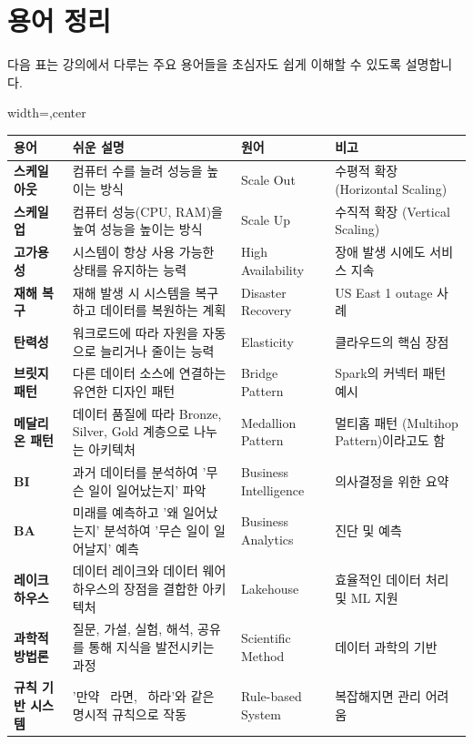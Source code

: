 \documentclass[11pt,a4paper]{article}
\theoremstyle{definition}
\begin{document}
\newpage
\section*{용어 정리}

\begin{tcolorbox}[summarybox={핵심 용어 및 설명}]
다음 표는 강의에서 다루는 주요 용어들을 초심자도 쉽게 이해할 수 있도록 설명합니다.

\begin{adjustbox}{width=\textwidth,center}
\begin{tabular}{llll}
\toprule
\textbf{용어} & \textbf{쉬운 설명} & \textbf{원어} & \textbf{비고} \\
\midrule
\textbf{스케일 아웃} & 컴퓨터 수를 늘려 성능을 높이는 방식 & Scale Out & 수평적 확장 (Horizontal Scaling) \\
\textbf{스케일 업} & 컴퓨터 성능(CPU, RAM)을 높여 성능을 높이는 방식 & Scale Up & 수직적 확장 (Vertical Scaling) \\
\textbf{고가용성} & 시스템이 항상 사용 가능한 상태를 유지하는 능력 & High Availability & 장애 발생 시에도 서비스 지속 \\
\textbf{재해 복구} & 재해 발생 시 시스템을 복구하고 데이터를 복원하는 계획 & Disaster Recovery & US East 1 outage 사례 \\
\textbf{탄력성} & 워크로드에 따라 자원을 자동으로 늘리거나 줄이는 능력 & Elasticity & 클라우드의 핵심 장점 \\
\textbf{브릿지 패턴} & 다른 데이터 소스에 연결하는 유연한 디자인 패턴 & Bridge Pattern & Spark의 커넥터 패턴 예시 \\
\textbf{메달리온 패턴} & 데이터 품질에 따라 Bronze, Silver, Gold 계층으로 나누는 아키텍처 & Medallion Pattern & 멀티홉 패턴 (Multihop Pattern)이라고도 함 \\
\textbf{BI} & 과거 데이터를 분석하여 '무슨 일이 일어났는지' 파악 & Business Intelligence & 의사결정을 위한 요약 \\
\textbf{BA} & 미래를 예측하고 '왜 일어났는지' 분석하여 '무슨 일이 일어날지' 예측 & Business Analytics & 진단 및 예측 \\
\textbf{레이크하우스} & 데이터 레이크와 데이터 웨어하우스의 장점을 결합한 아키텍처 & Lakehouse & 효율적인 데이터 처리 및 ML 지원 \\
\textbf{과학적 방법론} & 질문, 가설, 실험, 해석, 공유를 통해 지식을 발전시키는 과정 & Scientific Method & 데이터 과학의 기반 \\
\textbf{규칙 기반 시스템} & '만약 ~라면, ~하라'와 같은 명시적 규칙으로 작동 & Rule-based System & 복잡해지면 관리 어려움 \\

\end{tabular}
\end{adjustbox}
\end{tcolorbox}
\end{document}
